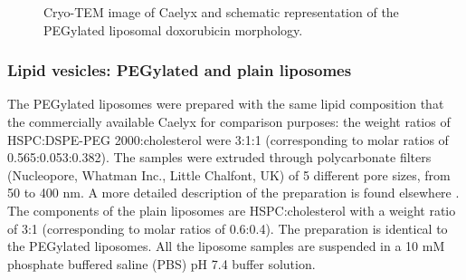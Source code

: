 \begin{figure}
	\centering
		\caption[Cryo-TEM image and schematic representation of Caelyx.]{Cryo-TEM image of Caelyx\textregistered \citep{barenholz_doxil_2012} and schematic representation of the PEGylated liposomal doxorubicin morphology.}
\end{figure}


%		

\subsubsection{Lipid vesicles: PEGylated and plain liposomes}
\label{sec:materials_liposome}

The PEGylated liposomes were prepared with the same lipid composition that the commercially available Caelyx \textregistered for comparison purposes: the weight ratios of HSPC:DSPE-PEG 2000:cholesterol were 3:1:1 (corresponding to molar ratios of 0.565:0.053:0.382). The samples were extruded through polycarbonate filters (Nucleopore, Whatman Inc., Little Chalfont, UK) of 5 different pore sizes, from 50 to 400 nm. A more detailed description of the preparation is found elsewhere \citep{varga_osmotic_2014}. The components of the plain liposomes are HSPC:cholesterol with a weight ratio of 3:1 (corresponding to molar ratios of 0.6:0.4). The preparation is identical to the PEGylated liposomes. All the liposome samples are suspended in a 10 mM phosphate buffered saline (PBS) pH 7.4 buffer solution.

